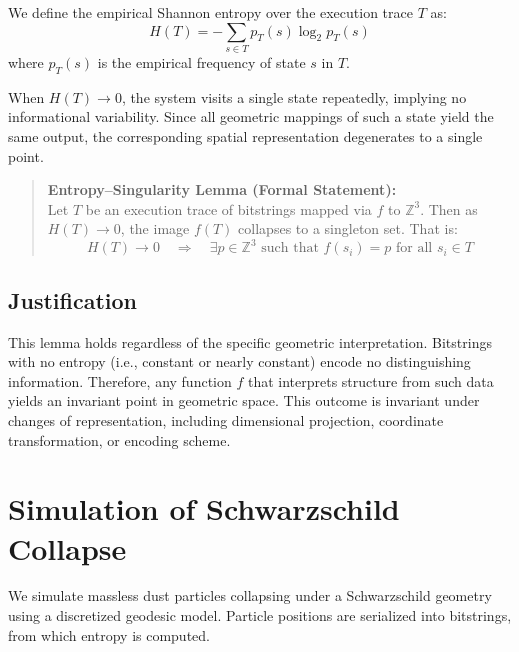 \documentclass[11pt]{article}
\begin{document}
We define the empirical Shannon entropy over the execution trace $T$ as:
\[
  H(T) = -\sum_{s \in T} p_T(s) \log_2 p_T(s)
\]
where $p_T(s)$ is the empirical frequency of state $s$ in $T$.

When $H(T) \to 0$, the system visits a single state repeatedly, implying no informational variability. Since all geometric mappings of such a state yield the same output, the corresponding spatial representation degenerates to a single point.

\begin{quote}
  \textbf{Entropy--Singularity Lemma (Formal Statement):} \\
  Let $T$ be an execution trace of bitstrings mapped via $f$ to $\mathbb{Z}^3$. Then as $H(T) \to 0$, the image $f(T)$ collapses to a singleton set. That is:
  \[
    H(T) \to 0 \quad \Rightarrow \quad \exists p \in \mathbb{Z}^3 \text{ such that } f(s_i) = p \text{ for all } s_i \in T
  \]
\end{quote}

\subsection*{Justification}

This lemma holds regardless of the specific geometric interpretation. Bitstrings with no entropy (i.e., constant or nearly constant) encode no distinguishing information. Therefore, any function $f$ that interprets structure from such data yields an invariant point in geometric space. This outcome is invariant under changes of representation, including dimensional projection, coordinate transformation, or encoding scheme.

\section{Simulation of Schwarzschild Collapse}

We simulate massless dust particles collapsing under a Schwarzschild geometry using a discretized geodesic model. Particle positions are serialized into bitstrings, from which entropy is computed.
\end{document}
